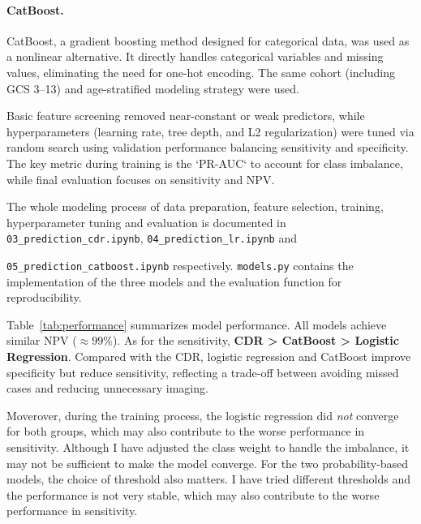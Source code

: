 \documentclass[10pt,letterpaper]{article}
\begin{document}
\paragraph{CatBoost.}
CatBoost, a gradient boosting method designed for categorical data, was used as a nonlinear alternative. It directly handles categorical variables and missing values, eliminating the need for one-hot encoding. The same cohort (including GCS 3--13) and age-stratified modeling strategy were used.

Basic feature screening removed near-constant or weak predictors, while hyperparameters (learning rate, tree depth, and L2 regularization) were tuned via random search using validation performance balancing sensitivity and specificity. The key metric during training is the `PR-AUC` to account for class imbalance, while final evaluation focuses on sensitivity and NPV. 

The whole modeling process of data preparation, feature selection, training, hyperparameter tuning and evaluation is documented in \texttt{03\_prediction\_cdr.ipynb}, \texttt{04\_prediction\_lr.ipynb} and 

\texttt{05\_prediction\_catboost.ipynb} respectively. \texttt{models.py} contains the implementation of the three models and the evaluation function for reproducibility.

Table~\ref{tab:performance} summarizes model performance. All models achieve similar NPV ($\approx99\%$). As for the sensitivity, \textbf{CDR > CatBoost > Logistic Regression}. Compared with the CDR, logistic regression and CatBoost improve specificity but reduce sensitivity, reflecting a trade-off between avoiding missed cases and reducing unnecessary imaging. 

Moverover, during the training process, the logistic regression did \emph{not} converge for both groups, which may also contribute to the worse performance in sensitivity. 
Although I have adjusted the class weight to handle the imbalance, it may not be sufficient to make the model converge. For the two probability-based models, the choice of threshold also matters. I have tried different thresholds and the performance is not very stable, which may also contribute to the worse performance in sensitivity.
\end{document}
